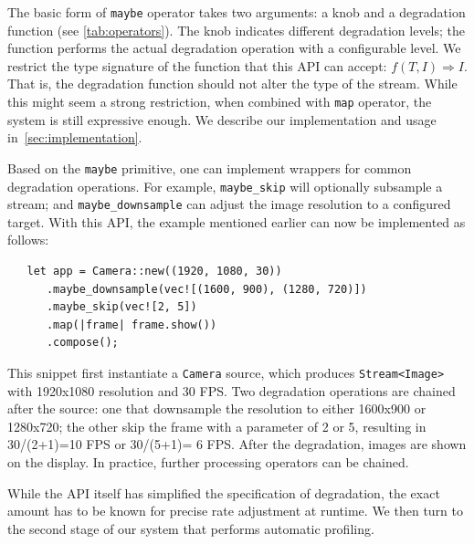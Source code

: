 The basic form of \texttt{maybe} operator takes two arguments: a knob and a
degradation function (see \autoref{tab:operators}). The knob indicates different
degradation levels; the function performs the actual degradation operation with
a configurable level. We restrict the type signature of the function that this
API can accept: $f(T, I) \Rightarrow I$. That is, the degradation function
should not alter the type of the stream. While this might seem a strong
restriction, when combined with \texttt{map} operator, the system is still
expressive enough. We describe our implementation and usage
in~\autoref{sec:implementation}.

Based on the \texttt{maybe} primitive, one can implement wrappers for common
degradation operations. For example, \texttt{maybe\_skip} will optionally
subsample a stream; and \texttt{maybe\_downsample} can adjust the image
resolution to a configured target. With this API, the example mentioned earlier
can now be implemented as follows:

\begin{lstlisting}
   let app = Camera::new((1920, 1080, 30))
      .maybe_downsample(vec![(1600, 900), (1280, 720)])
      .maybe_skip(vec![2, 5])
      .map(|frame| frame.show())
      .compose();
\end{lstlisting}

This snippet first instantiate a \texttt{Camera} source, which produces
\texttt{Stream<Image>} with 1920x1080 resolution and 30 FPS. Two degradation
operations are chained after the source: one that downsample the resolution to
either 1600x900 or 1280x720; the other skip the frame with a parameter of 2 or
5, resulting in 30/(2+1)=10 FPS or 30/(5+1)= 6 FPS. After the degradation,
images are shown on the display. In practice, further processing operators can
be chained.

While the API itself has simplified the specification of degradation, the exact
amount has to be known for precise rate adjustment at runtime. We then turn to
the second stage of our system that performs automatic profiling.

